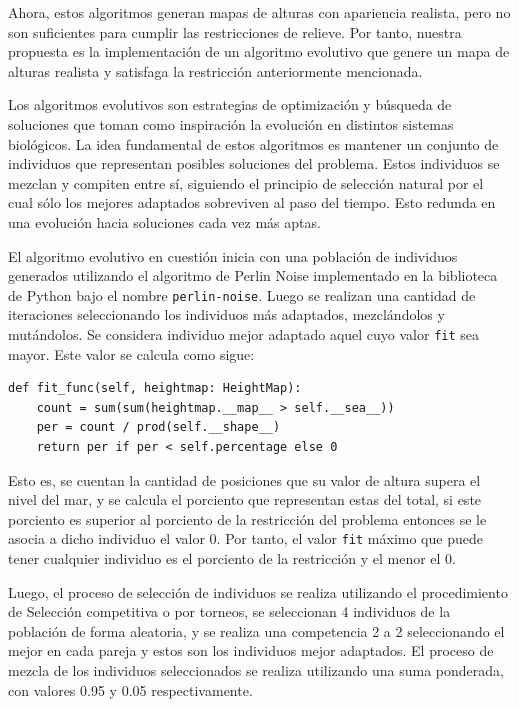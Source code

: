 Ahora, estos algoritmos generan mapas de alturas con apariencia realista, pero no son suficientes para cumplir las restricciones de relieve. Por tanto, nuestra propuesta es la implementación de un algoritmo evolutivo que genere un mapa de alturas realista y satisfaga la restricción anteriormente mencionada.

Los algoritmos evolutivos son estrategias de optimización y búsqueda de soluciones que toman como inspiración la evolución en distintos sistemas biológicos. La idea fundamental de estos algoritmos es mantener un conjunto de individuos que representan posibles soluciones del problema. Estos individuos se mezclan y compiten entre sí, siguiendo el principio de selección natural por el cual sólo los mejores adaptados sobreviven al paso del tiempo. Esto redunda en una evolución hacia soluciones cada vez más aptas. 

El algoritmo evolutivo en cuestión inicia con una población de individuos generados utilizando el algoritmo de Perlin Noise implementado en la biblioteca de Python bajo el nombre \verb|perlin-noise|.	Luego se realizan una cantidad de iteraciones seleccionando los individuos más adaptados, mezclándolos y mutándolos.  Se considera individuo mejor adaptado aquel cuyo valor \verb|fit| sea mayor. Este valor se calcula como sigue:

\begin{verbatim}
def fit_func(self, heightmap: HeightMap):
    count = sum(sum(heightmap.__map__ > self.__sea__))
    per = count / prod(self.__shape__)
    return per if per < self.percentage else 0
\end{verbatim}

Esto es, se cuentan la cantidad de posiciones que su valor de altura supera el nivel del mar, y se calcula el porciento que representan estas del total, si este porciento es superior al porciento de la restricción del problema entonces se le asocia a dicho individuo el valor 0.  Por tanto, el valor \verb|fit| máximo que puede tener cualquier individuo es el porciento de la restricción y el menor el 0.

Luego, el proceso de selección de individuos se realiza utilizando el procedimiento de Selección competitiva o por torneos, se seleccionan  4 individuos de la población de forma aleatoria, y se realiza una competencia 2 a 2 seleccionando el mejor en cada pareja y estos son los individuos mejor adaptados. El proceso de mezcla de los individuos seleccionados se realiza utilizando una suma ponderada, con valores 0.95 y 0.05 respectivamente. 


